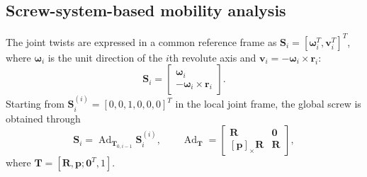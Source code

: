 ﻿\documentclass[a4paper,fleqn]{cas-sc}
\begin{document}
\subsection{Screw-system-based mobility analysis}

The joint twists are expressed in a common reference frame as
\(\mathbf S_i=[\boldsymbol{\omega}_i^T,\mathbf v_i^T]^T\), where
\(\boldsymbol{\omega}_i\) is the unit direction of the \(i\)th revolute axis
and \(\mathbf v_i=-\boldsymbol{\omega}_i\times\mathbf r_i\):
\begin{equation}
\mathbf S_i=
\begin{bmatrix}
\boldsymbol{\omega}_i\\
-\boldsymbol{\omega}_i\times\mathbf r_i
\end{bmatrix}.
\label{eq:screw_definition}
\end{equation}
Starting from \(\mathbf S_i^{(i)}=[0,0,1,0,0,0]^T\) in the local joint frame,
the global screw is obtained through
\begin{equation}
\mathbf S_i=\operatorname{Ad}_{\mathbf T_{0,i-1}}\mathbf S_i^{(i)},\qquad
\operatorname{Ad}_{\mathbf T}=
\begin{bmatrix}
\mathbf R&\mathbf 0\\
[\mathbf p]_{\times}\mathbf R&\mathbf R
\end{bmatrix},
\label{eq:adjoint_mapping}
\end{equation}
where \(\mathbf T=[\mathbf R,\mathbf p;\mathbf 0^T,1]\).
\end{document}
